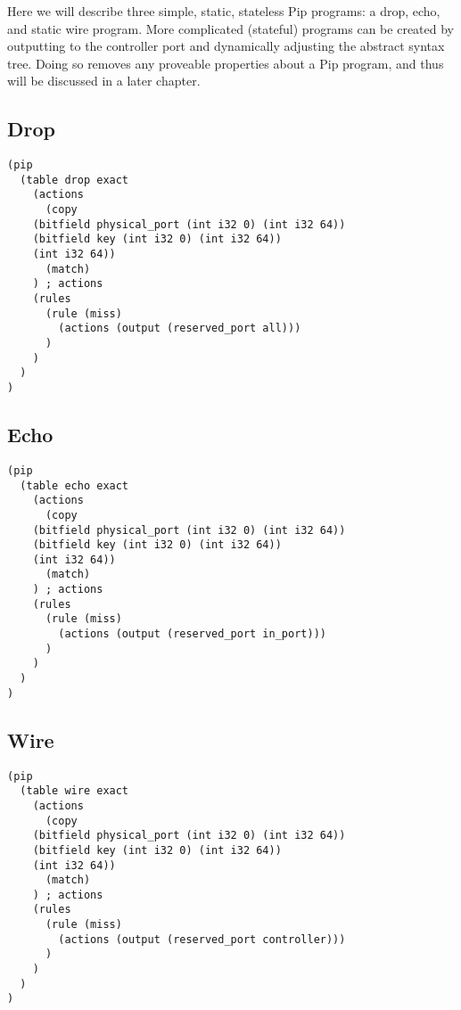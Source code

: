 \documentclass{article}
\begin{document}
Here we will describe three simple, static, stateless Pip programs: a drop, echo, and static wire program. More complicated (stateful) programs can be created by outputting to the controller port and dynamically adjusting the abstract syntax tree. Doing so removes any proveable properties about a Pip program, and thus will be discussed in a later chapter.

\subsection{Drop}
\begin{verbatim}
(pip
  (table drop exact
    (actions
      (copy
	(bitfield physical_port (int i32 0) (int i32 64))
	(bitfield key (int i32 0) (int i32 64))
	(int i32 64))
      (match)
    ) ; actions
    (rules
      (rule (miss)
        (actions (output (reserved_port all)))
      )
    )
  )
)
\end{verbatim}

\subsection{Echo}
\begin{verbatim}
(pip
  (table echo exact
    (actions
      (copy
	(bitfield physical_port (int i32 0) (int i32 64))
	(bitfield key (int i32 0) (int i32 64))
	(int i32 64))
      (match)
    ) ; actions
    (rules
      (rule (miss)
        (actions (output (reserved_port in_port)))
      )
    )
  )
)
\end{verbatim}

\subsection{Wire}
\begin{verbatim}
(pip
  (table wire exact
    (actions
      (copy
	(bitfield physical_port (int i32 0) (int i32 64))
	(bitfield key (int i32 0) (int i32 64))
	(int i32 64))
      (match)
    ) ; actions
    (rules
      (rule (miss)
        (actions (output (reserved_port controller)))
      )
    )
  )
)
\end{verbatim}
\end{document}
